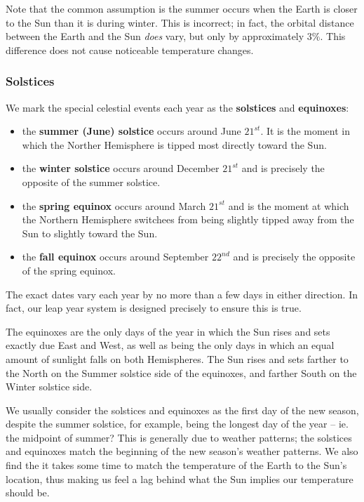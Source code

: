 \documentclass[12pt]{article}
\begin{document}
Note that the common assumption is the summer occurs when the Earth is closer to the Sun than it is during winter. This is incorrect; in fact, the orbital distance between the Earth and the Sun \emph{does} vary, but only by approximately $3\%$. This difference does not cause noticeable temperature changes.

\subsubsection{Solstices}
We mark the special celestial events each year as the {\bf solstices} and {\bf equinoxes}:
\begin{itemize}
\item the {\bf summer (June) solstice} occurs around June $21^{st}$. It is the moment in which the Norther Hemisphere is tipped most directly toward the Sun.
\item the {\bf winter solstice} occurs around December $21^{st}$ and is precisely the opposite of the summer solstice.
\item the {\bf spring equinox} occurs around March $21^{st}$ and is the moment at which the Northern Hemisphere switchees from being slightly tipped away from the Sun to slightly toward the Sun.
\item the {\bf fall equinox} occurs around September $22^{nd}$ and is precisely the opposite of the spring equinox.
\end{itemize}

The exact dates vary each year by no more than a few days in either direction. In fact, our leap year system is designed precisely to ensure this is true.

The equinoxes are the only days of the year in which the Sun rises and sets exactly due East and West, as well as being the only days in which an equal amount of sunlight falls on both Hemispheres. The Sun rises and sets farther to the North on the Summer solstice side of the equinoxes, and farther South on the Winter solstice side.

We usually consider the solstices and equinoxes as the first day of the new season, despite the summer solstice, for example, being the longest day of the year -- ie. the midpoint of summer? This is generally due to weather patterns; the solstices and equinoxes match the beginning of the new season's weather patterns. We also find the it takes some time to match the temperature of the Earth to the Sun's location, thus making us feel a lag behind what the Sun implies our temperature should be.
\end{document}
